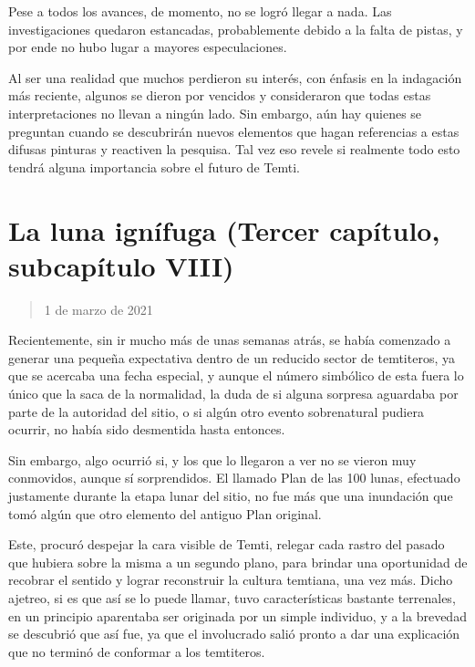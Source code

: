\documentclass[
  spanish,
]{book}
\begin{document}
Pese a todos los avances, de momento, no se logró llegar a nada. Las investigaciones quedaron estancadas, probablemente debido a la falta de pistas, y por ende no hubo lugar a mayores especulaciones.

Al ser una realidad que muchos perdieron su interés, con énfasis en la indagación más reciente, algunos se dieron por vencidos y consideraron que todas estas interpretaciones no llevan a ningún lado. Sin embargo, aún hay quienes se preguntan cuando se descubrirán nuevos elementos que hagan referencias a estas difusas pinturas y reactiven la pesquisa. Tal vez eso revele si realmente todo esto tendrá alguna importancia sobre el futuro de Temti.

\hypertarget{la-luna-ignuxedfuga-tercer-capuxedtulo-subcapuxedtulo-viii}{%
\section{La luna ignífuga (Tercer capítulo, subcapítulo VIII)}\label{la-luna-ignuxedfuga-tercer-capuxedtulo-subcapuxedtulo-viii}}

\begin{quote}
1 de marzo de 2021
\end{quote}

Recientemente, sin ir mucho más de unas semanas atrás, se había comenzado a generar una pequeña expectativa dentro de un reducido sector de temtiteros, ya que se acercaba una fecha especial, y aunque el número simbólico de esta fuera lo único que la saca de la normalidad, la duda de si alguna sorpresa aguardaba por parte de la autoridad del sitio, o si algún otro evento sobrenatural pudiera ocurrir, no había sido desmentida hasta entonces.

Sin embargo, algo ocurrió si, y los que lo llegaron a ver no se vieron muy conmovidos, aunque sí sorprendidos. El llamado Plan de las 100 lunas, efectuado justamente durante la etapa lunar del sitio, no fue más que una inundación que tomó algún que otro elemento del antiguo Plan original.

Este, procuró despejar la cara visible de Temti, relegar cada rastro del pasado que hubiera sobre la misma a un segundo plano, para brindar una oportunidad de recobrar el sentido y lograr reconstruir la cultura temtiana, una vez más. Dicho ajetreo, si es que así se lo puede llamar, tuvo características bastante terrenales, en un principio aparentaba ser originada por un simple individuo, y a la brevedad se descubrió que así fue, ya que el involucrado salió pronto a dar una explicación que no terminó de conformar a los temtiteros.
\end{document}
